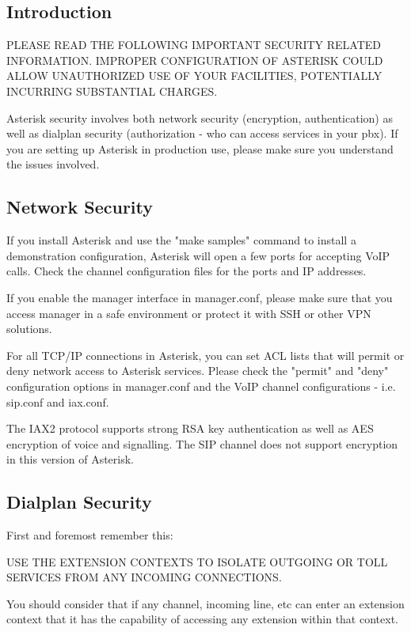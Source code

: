 \subsection{Introduction}

PLEASE READ THE FOLLOWING IMPORTANT SECURITY RELATED INFORMATION.  
IMPROPER CONFIGURATION OF ASTERISK COULD ALLOW UNAUTHORIZED USE OF YOUR
FACILITIES, POTENTIALLY INCURRING SUBSTANTIAL CHARGES.

Asterisk security involves both network security (encryption, authentication)
as well as dialplan security (authorization - who can access services in 
your pbx). If you are setting up Asterisk in production use, please make
sure you understand the issues involved.

\subsection{Network Security}

If you install Asterisk and use the "make samples" command to install
a demonstration configuration, Asterisk will open a few ports for accepting
VoIP calls. Check the channel configuration files for the ports and IP addresses.

If you enable the manager interface in manager.conf, please make sure that
you access manager in a safe environment or protect it with SSH or other
VPN solutions.

For all TCP/IP connections in Asterisk, you can set ACL lists that
will permit or deny network access to Asterisk services. Please check
the "permit" and "deny" configuration options in manager.conf and
the VoIP channel configurations - i.e. sip.conf and iax.conf.

The IAX2 protocol supports strong RSA key authentication as well as
AES encryption of voice and signalling. The SIP channel does not
support encryption in this version of Asterisk.

\subsection{Dialplan Security}

First and foremost remember this:

USE THE EXTENSION CONTEXTS TO ISOLATE OUTGOING OR TOLL SERVICES FROM ANY
INCOMING CONNECTIONS.

You should consider that if any channel, incoming line, etc can enter an
extension context that it has the capability of accessing any extension
within that context. 

